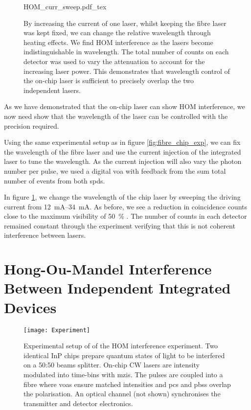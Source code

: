 \begin{figure}[tp]
	\centering
	\small
	\def\svgwidth{0.8\textwidth} 
	{HOM_curr_sweep.pdf_tex}
	\caption[HOM between fibre components and chip by varying laser current]{By increasing the current of one laser, whilst keeping the fibre laser was kept fixed, we can change the relative wavelength through heating effects. We find \ac{HOM} interference as the lasers become indistinguishable in wavelength. The total number of counts on each detector was used to vary the attenuation to account for the increasing laser power. This demonstrates that wavelength control of the on-chip laser is sufficient to precisely overlap the two independent lasers.}
	\label{fig:fibre_curr_sweep}
\end{figure}

As we have demonstrated that the on-chip laser can show \ac{HOM} interference, we now need show that the wavelength of the laser can be controlled with the precision required.

Using the same experimental setup as in figure \ref{fig:fibre_chip_exp}, we can fix the wavelength of the fibre laser and use the current injection of the integrated laser to tune the wavelength. As the current injection will also vary the photon number per pulse, we used a digital \ac{voa} with feedback from the sum total number of events from both \acp{spd}. 

In figure \ref{fig:fibre_curr_sweep}, we change the wavelength of the chip laser by sweeping the driving current from \SIrange{12}{34}{mA}. As before, we see a reduction in coincidence counts close to the maximum visibility of \SI{50}{\percent} \cite{Rarity2005}. The number of counts in each detector remained constant through the experiment verifying that this is not coherent interference between lasers.

\section{Hong-Ou-Mandel Interference Between Independent Integrated Devices}

\begin{figure}[tp]
	\centering
	\texttt{[image: Experiment]}
	\caption[Hong-Ou-Mandel interference experimental setup]{Experimental setup of of the \ac{HOM} interference experiment. Two identical \ac{InP} chips prepare quantum states of light to be interfered on a {50:50} beams splitter. On-chip \ac{CW} lasers are intensity modulated into time-bins with \acp{mzi}. The pulses are coupled into a fibre where \acp{voa} ensure matched intensities and \acp{pc} and \acp{pbs} overlap the polarisation. An optical channel (not shown) synchronises the transmitter and detector electronics.}
	\label{fig:hom_experiment}
\end{figure}

